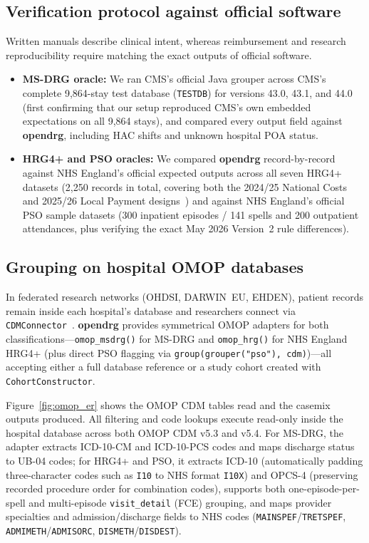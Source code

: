 \documentclass[fleqn,10pt]{IOMEDArticle}
\begin{document}
\subsection{Verification protocol against official software}

Written manuals describe clinical intent, whereas reimbursement and research reproducibility require matching the exact outputs of official software.
\begin{itemize}[leftmargin=*,nosep]
    \item \textbf{MS-DRG oracle:} We ran CMS's official Java grouper across CMS's complete 9{,}864-stay test database (\texttt{TESTDB}) for versions 43.0, 43.1, and 44.0 (first confirming that our setup reproduced CMS's own embedded expectations on all 9{,}864 stays), and compared every output field against \textbf{opendrg}, including HAC shifts and unknown hospital POA status.
    \item \textbf{HRG4+ and PSO oracles:} We compared \textbf{opendrg} record-by-record against NHS England's official expected outputs across all seven HRG4+ datasets (2{,}250 records in total, covering both the 2024/25 National Costs and 2025/26 Local Payment designs~\cite{nhse2025lpg}) and against NHS England's official PSO sample datasets (300 inpatient episodes / 141 spells and 200 outpatient attendances, plus verifying the exact May 2026 Version~2 rule differences).
\end{itemize}

\subsection{Grouping on hospital OMOP databases}

{\sloppy In federated research networks (OHDSI, DARWIN~EU, EHDEN), patient records remain inside each hospital's database and researchers connect via \texttt{CDMConnector}~\cite{black2025cdmconnector}. \textbf{opendrg} provides symmetrical OMOP adapters for both classifications---\texttt{omop\_msdrg()} for MS-DRG and \texttt{omop\_hrg()} for NHS England HRG4+ (plus direct PSO flagging via \texttt{group(grouper("pso"), cdm)})---all accepting either a full database reference or a study cohort created with \texttt{CohortConstructor}.\par}

Figure~\ref{fig:omop_er} shows the OMOP CDM tables read and the casemix outputs produced. All filtering and code lookups execute read-only inside the hospital database across both OMOP CDM v5.3 and v5.4. For MS-DRG, the adapter extracts ICD-10-CM and ICD-10-PCS codes and maps discharge status to UB-04 codes; for HRG4+ and PSO, it extracts ICD-10 (automatically padding three-character codes such as \texttt{I10} to NHS format \texttt{I10X}) and OPCS-4 (preserving recorded procedure order for combination codes), supports both one-episode-per-spell and multi-episode \texttt{visit\_detail} (FCE) grouping, and maps provider specialties and admission/discharge fields to NHS codes (\texttt{MAINSPEF}/\texttt{TRETSPEF}, \texttt{ADMIMETH}/\texttt{ADMISORC}, \texttt{DISMETH}/\texttt{DISDEST}).
\end{document}
